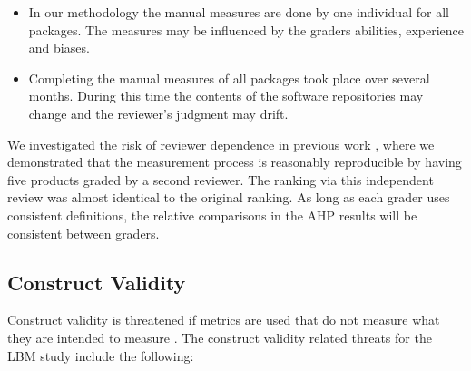 \documentclass[final, 3p, times, authoryear]{elsarticle}
\begin{document}
\begin{itemize}
\item In our methodology the manual measures are done by one individual for all
packages. The measures may be influenced by the graders abilities, experience
and biases.  
\item Completing the manual measures of all packages took place over several
months. During this time the contents of the software repositories may change
and the reviewer's judgment may drift.
\end{itemize}

We investigated the risk of reviewer dependence in previous work
\citep{SmithEtAl2016}, where we demonstrated that the measurement process is
reasonably reproducible by having five products graded by a second reviewer. The
ranking via this independent review was almost identical to the original
ranking. As long as each grader uses consistent definitions, the relative
comparisons in the AHP results will be consistent between graders.

\subsection{Construct Validity}

Construct validity is threatened if metrics are used that do not measure what
they are intended to measure \citep{AmpatzoglouEtAl2019}. The construct
validity related threats for the LBM study include the following:
\end{document}
